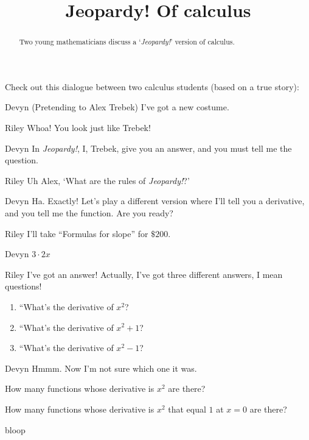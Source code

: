 \documentclass{ximera}
\title[Break-Ground:]{Jeopardy! Of calculus}
\begin{document}
\begin{abstract}
  Two young mathematicians discuss a `\textit{Jeopardy!}' version of calculus.
\end{abstract}
\maketitle

Check out this dialogue between two calculus students (based on a true story):


\begin{dialogue}
\item[Devyn] (Pretending to Alex Trebek) I've got a new costume.
\item[Riley] Whoa! You look just like Trebek!
\item[Devyn] In \textit{Jeopardy!}, I, Trebek, give you an answer, and you must tell me the question.
\item[Riley] Uh Alex, `What are the rules of \textit{Jeopardy!}?'
\item[Devyn] Ha. Exactly! Let's play a different version where I'll
  tell you a derivative, and you tell me the function.  Are you ready?
\item[Riley] I'll take ``Formulas for slope'' for $\$200$.
\item[Devyn] $3\cdot 2x$  
\item[Riley] I've got an answer!  Actually, I've got three different
  answers, I mean questions!
  \begin{enumerate}
  \item ``What's the derivative of $x^2$?
  \item ``What's the derivative of $x^2+1$?
  \item ``What's the derivative of $x^2-1$?
  \end{enumerate}
\item[Devyn] Hmmm. Now I'm not sure which one it was.
\end{dialogue}


\begin{problem}
  How many functions whose derivative is $x^2$ are there?
  \begin{multipleChoice}
  \end{multipleChoice}
\end{problem}

\begin{problem}
  How many functions whose derivative is $x^2$ that equal
  $1$ at $x=0$ are there?
  \begin{multipleChoice}
  \end{multipleChoice}
\end{problem}

bloop
%
\end{document}
